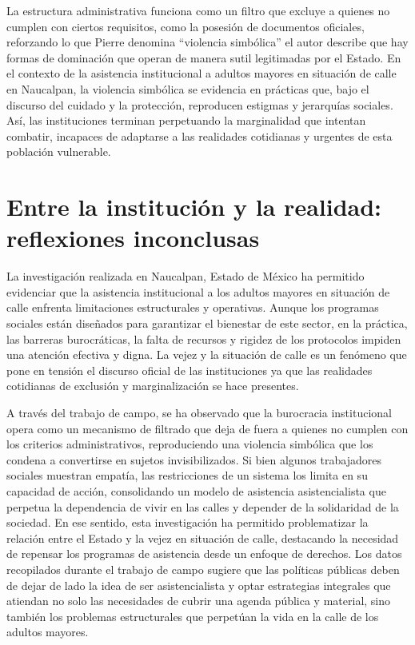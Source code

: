 \documentclass[
  spanish,
  11pt,
  a4paper,
]{scrbook}
\begin{document}
La estructura administrativa funciona como un filtro que excluye a
quienes no cumplen con ciertos requisitos, como la posesión de
documentos oficiales, reforzando lo que Pierre \textcite{Bourdieu1994}
denomina ``violencia simbólica'' el autor describe que hay formas de
dominación que operan de manera sutil legitimadas por el Estado. En el
contexto de la asistencia institucional a adultos mayores en situación
de calle en Naucalpan, la violencia simbólica se evidencia en prácticas
que, bajo el discurso del cuidado y la protección, reproducen estigmas y
jerarquías sociales. Así, las instituciones terminan perpetuando la
marginalidad que intentan combatir, incapaces de adaptarse a las
realidades cotidianas y urgentes de esta población vulnerable.

\section*{Entre la institución y la realidad: reflexiones
inconclusas}\label{entre-la-instituciuxf3n-y-la-realidad-reflexiones-inconclusas}


La investigación realizada en Naucalpan, Estado de México ha permitido
evidenciar que la asistencia institucional a los adultos mayores en
situación de calle enfrenta limitaciones estructurales y operativas.
Aunque los programas sociales están diseñados para garantizar el
bienestar de este sector, en la práctica, las barreras burocráticas, la
falta de recursos y rigidez de los protocolos impiden una atención
efectiva y digna. La vejez y la situación de calle es un fenómeno que
pone en tensión el discurso oficial de las instituciones ya que las
realidades cotidianas de exclusión y marginalización se hace presentes.

A través del trabajo de campo, se ha observado que la burocracia
institucional opera como un mecanismo de filtrado que deja de fuera a
quienes no cumplen con los criterios administrativos, reproduciendo una
violencia simbólica que los condena a convertirse en sujetos
invisibilizados. Si bien algunos trabajadores sociales muestran empatía,
las restricciones de un sistema los limita en su capacidad de acción,
consolidando un modelo de asistencia asistencialista que perpetua la
dependencia de vivir en las calles y depender de la solidaridad de la
sociedad. En ese sentido, esta investigación ha permitido problematizar
la relación entre el Estado y la vejez en situación de calle, destacando
la necesidad de repensar los programas de asistencia desde un enfoque de
derechos. Los datos recopilados durante el trabajo de campo sugiere que
las políticas públicas deben de dejar de lado la idea de ser
asistencialista y optar estrategias integrales que atiendan no solo las
necesidades de cubrir una agenda pública y material, sino también los
problemas estructurales que perpetúan la vida en la calle de los adultos
mayores.
\end{document}
